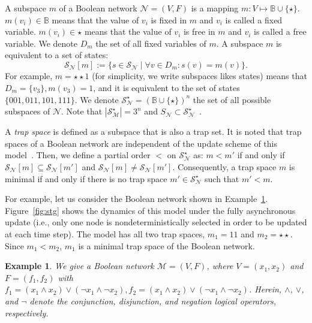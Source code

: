 \documentclass[preprint,12pt]{elsarticle}
\newtheorem{example}{Example}[section]
\begin{document}
A subspace \(m\) of a Boolean network \(\mathcal{N} = (V, F)\) is a mapping \(m \colon V \mapsto \mathbb{B} \cup \{\star\}\).
\(m(v_i) \in \mathbb{B}\) means that the value of \(v_i\) is fixed in \(m\) and \(v_i\) is called a fixed variable.
\(m(v_i) \in \star\) means that the value of \(v_i\) is free in \(m\) and \(v_i\) is called a free variable.
We denote \(D_m\) the set of all fixed variables of \(m\).
A subspace \(m\) is equivalent to a set of states:
\[
\mathcal{S}_{\mathcal{N}}[m] := \{s \in \mathcal{S}_{\mathcal{N}} \mid \forall v \in D_m \colon s(v) = m(v)\}.
\] For example, \(m = \star\star1\) (for simplicity, we write subspaces likes states) means that \(D_m = \{v_3\}, m(v_3) = 1\), and it is equivalent to the set of states \(\{001, 011, 101, 111\}\).
We denote \(\mathcal{S}_{\mathcal{N}}^{\star} = (\mathbb{B} \cup \{\star\})^n\) the set of all possible subspaces of \(\mathcal{N}\).
Note that \(\left\vert\mathcal{S}_{\mathcal{M}}^{\star}\right\vert = 3^n\) and \(S_{\mathcal{N}} \subset \mathcal{S}_{\mathcal{N}}^{\star}\)~\cite{klarner2015computing}.

A \emph{trap space} is defined as a subspace that is also a trap set.
It is noted that trap spaces of a Boolean network are independent of the update scheme of this model~\cite{klarner2015computing}.
Then, we define a partial order \(<\) on \(\mathcal{S}_{\mathcal{N}}^{\star}\) as: \(m < m'\) if and only if \(\mathcal{S}_{\mathcal{N}}[m] \subseteq \mathcal{S}_{\mathcal{N}}[m']\) and \(\mathcal{S}_{\mathcal{N}}[m] \neq \mathcal{S}_{\mathcal{N}}[m']\).
Consequently, a trap space \(m\) is minimal if and only if there is no trap space \(m' \in \mathcal{S}_{\mathcal{N}}^{\star}\) such that \(m' < m\).

For example, let us consider the Boolean network shown in Example~\ref{example:BN}.
Figure~\ref{fig:stg} shows the dynamics of this model under the fully asynchronous update (i.e., only one node is nondeterministically selected in order to be updated at each time step).
The model has all two trap spaces, \(m_1 = 11\) and \(m_2 = \star\star\).
Since \(m_1 < m_2\), \(m_1\) is a minimal trap space of the Boolean network.

\begin{example}
We give a Boolean network \(\mathcal{M} = (V, F)\), where \(V = (x_1, x_2)\) and \(F = (f_1, f_2)\) with \(f_1 = (x_1 \land x_2) \lor (\neg x_1 \land \neg x_2), f_2 = (x_1 \land x_2) \lor (\neg x_1 \land \neg x_2)\). Herein, \(\land\), \(\lor\), and \(\neg\) denote the conjunction, disjunction, and negation logical operators, respectively.\label{example:BN}
\end{example}
\end{document}
